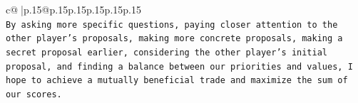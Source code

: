 \documentclass{article}
\begin{document}
{\begin{supertabular}{c@{$\;$}|p{.15\linewidth}@{}p{.15\linewidth}p{.15\linewidth}p{.15\linewidth}p{.15\linewidth}p{.15\linewidth}}
{{{\\ 
\texttt{By asking more specific questions, paying closer attention to the other player's proposals, making more concrete proposals, making a secret proposal earlier, considering the other player's initial proposal, and finding a balance between our priorities and values, I hope to achieve a mutually beneficial trade and maximize the sum of our scores.} \\
            }
        }
    }
     \\ \\

\end{supertabular}
}
\end{document}
